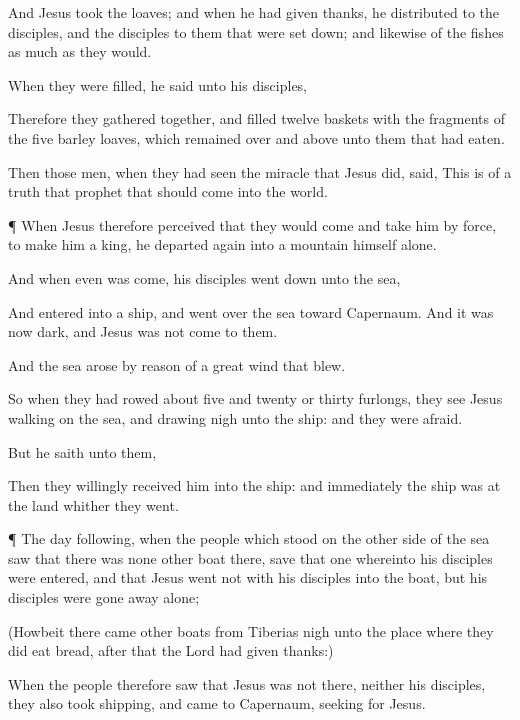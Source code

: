 {And
Jesus
took the
loaves;
and when he had given
thanks, he
distributed to the
disciples,
and the
disciples to them that were set
down;
and
likewise
of the
fishes as much
as they
would.

When they were
filled, he
said unto
his
disciples,
{}

Therefore they
gathered
{}
together,
and
filled
twelve
baskets with the
fragments
of the
five
barley
loaves,
which remained over and
above unto them that had
eaten.

Then those
men, when they had
seen the
miracle
that
Jesus
did,
said,
This
is of a
truth that
prophet that should
come
into the
world.


\par }{\PP {}¶
When
Jesus
therefore
perceived
that they
would
come
and
take
him by
force,
to
make
him a
king, he
departed
again
into a
mountain
himself
alone.

And
when
even
was
{}
come,
his
disciples went
down
unto the
sea,

And
entered
into a
ship, and
went
over the
sea
toward
Capernaum.
And it
was
now
dark,
and
Jesus
was
not
come
to
them.

And the
sea
arose by reason of a
great
wind that
blew.

So
when they had
rowed
about five and
twenty
or
thirty
furlongs, they
see
Jesus
walking
on the
sea,
and
drawing
nigh unto the
ship:
and they were
afraid.

But he
saith unto
them,
{}

Then they
willingly
received
him
into the
ship:
and
immediately the
ship
was
at the
land
whither
they
went.


\par }{\PP {}¶ The day
following, when the
people which
stood on the other
side of the
sea
saw
that there
was
none
other
boat
there,
save
that
one
whereinto
his
disciples were
entered,
and
that
Jesus
went
not
with
his
disciples
into the
boat,
but
{}
his
disciples were gone
away
alone;

(Howbeit there
came
other
boats
from
Tiberias nigh
unto the
place
where they did
eat
bread, after
that the
Lord had given
thanks:)

When the
people
therefore
saw
that
Jesus
was
not
there,
neither
his
disciples,
they
also
took
shipping,
and
came
to
Capernaum, seeking
for
Jesus.

}
